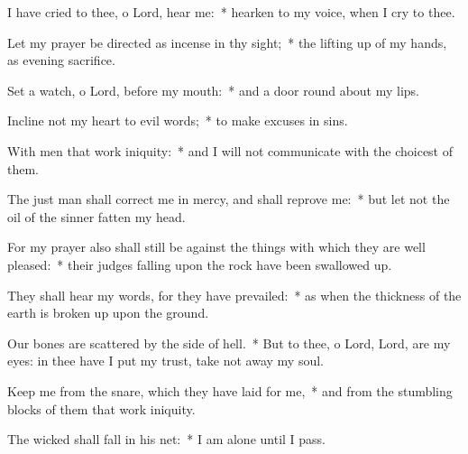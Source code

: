 \begin{enpars}
\item I have cried to thee, o Lord, hear me:~* hearken to my voice, when I cry to thee.
\item Let my prayer be directed as incense in thy sight;~* the lifting up of my hands, as evening sacrifice.
\item Set a watch, o Lord, before my mouth:~* and a door round about my lips.
\item Incline not my heart to evil words;~* to make excuses in sins.
\item With men that work iniquity:~* and I will not communicate with the choicest of them.
\item The just man shall correct me in mercy, and shall reprove me:~* but let not the oil of the sinner fatten my head.
\item For my prayer also shall still be against the things with which they are well pleased:~* their judges falling upon the rock have been swallowed up.
\item They shall hear my words, for they have prevailed:~* as when the thickness of the earth is broken up upon the ground.
\item Our bones are scattered by the side of hell.~* But to thee, o Lord, Lord, are my eyes: in thee have I put my trust, take not away my soul.
\item Keep me from the snare, which they have laid for me,~* and from the stumbling blocks of them that work iniquity.
\item The wicked shall fall in his net:~* I am alone until I pass.
\end{enpars}